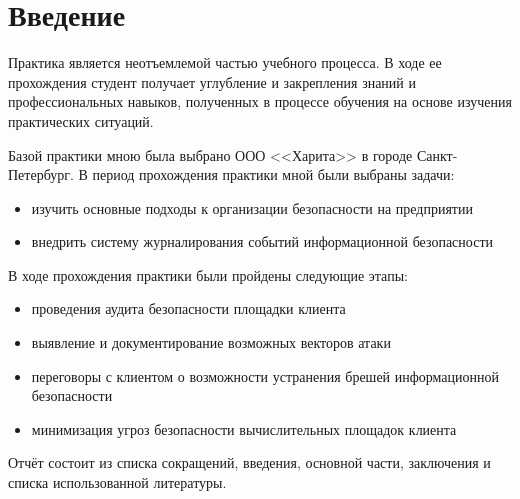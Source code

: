 \chapter{Введение}

Практика является неотъемлемой частью учебного процесса. В ходе ее прохождения студент получает углубление и закрепления знаний и профессиональных навыков, полученных в процессе обучения на основе изучения практических ситуаций. 

Базой практики мною была выбрано ООО <<Харита>> в городе Санкт-Петербург.
В период прохождения практики мной были выбраны задачи:
\begin{itemize}
	\item изучить основные подходы к организации безопасности на предприятии
	\item внедрить систему журналирования событий информационной безопасности
\end{itemize}

В ходе прохождения практики были пройдены следующие этапы:

\begin{itemize}
	\item проведения аудита безопасности площадки клиента
	\item выявление и документирование возможных векторов атаки
	\item переговоры с клиентом о возможности устранения брешей информационной безопасности
	\item минимизация угроз безопасности вычислительных площадок клиента
\end{itemize}

Отчёт состоит из списка сокращений, введения, основной части, заключения и списка использованной литературы.
